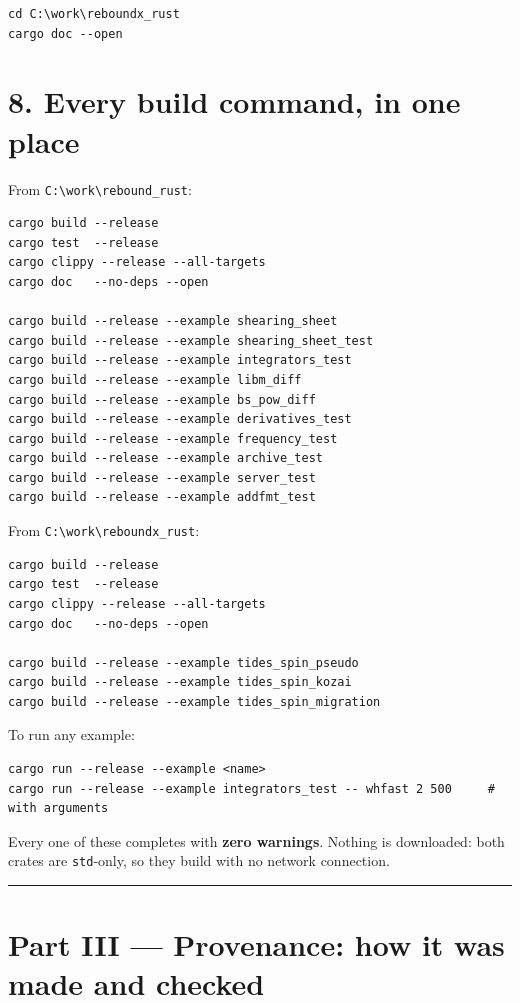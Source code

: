 \documentclass[11pt]{article}
\begin{document}
\begin{lstlisting}
cd C:\work\reboundx_rust
cargo doc --open
\end{lstlisting}

\section{8. Every build command, in one place}

From \texttt{C:\textbackslash{}work\textbackslash{}rebound\_rust}:

\begin{lstlisting}
cargo build --release
cargo test  --release
cargo clippy --release --all-targets
cargo doc   --no-deps --open

cargo build --release --example shearing_sheet
cargo build --release --example shearing_sheet_test
cargo build --release --example integrators_test
cargo build --release --example libm_diff
cargo build --release --example bs_pow_diff
cargo build --release --example derivatives_test
cargo build --release --example frequency_test
cargo build --release --example archive_test
cargo build --release --example server_test
cargo build --release --example addfmt_test
\end{lstlisting}

From \texttt{C:\textbackslash{}work\textbackslash{}reboundx\_rust}:

\begin{lstlisting}
cargo build --release
cargo test  --release
cargo clippy --release --all-targets
cargo doc   --no-deps --open

cargo build --release --example tides_spin_pseudo
cargo build --release --example tides_spin_kozai
cargo build --release --example tides_spin_migration
\end{lstlisting}

To run any example:

\begin{lstlisting}
cargo run --release --example <name>
cargo run --release --example integrators_test -- whfast 2 500     # with arguments
\end{lstlisting}

Every one of these completes with \textbf{zero warnings}. Nothing is downloaded: both crates are \texttt{std}-only, so they build with no network connection.

\bigskip\hrule\bigskip

\clearpage
\section*{Part III --- Provenance: how it was made and checked}
\end{document}
